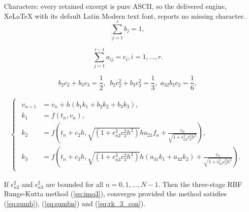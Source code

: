 \documentclass[10pt,a4paper]{amsart}
\begin{document}
Characters: every retained excerpt is pure ASCII, so the delivered engine, XeLaTeX with its default Latin Modern text font, reports no missing character.
\begin{equation}    \label{eq:sumb}
\sum_{j=1}^{r}{b_j} = 1,
\end{equation}

\begin{equation}    \label{eq:sumbn}
\sum_{j=1}^{i-1}{a_{ij}} = c_i, i = 1,...,r.
\end{equation}

\begin{equation}\label{eq:rk_3_con}
b_2 c_2 + b_3 c_3 = \frac{1}{2},\,\,\, b_2 c_2^2 + b_3 c_3^2 = \frac{1}{3},\,\, a_{32} b_3 c_2 = \frac{1}{6},
\end{equation}

\begin{eqnarray}    \label{eq:imq3}  
\begin{cases}
\begin{aligned}
v_{n+1} & = v_n + h(b_1 k_1 + b_2 k_2 + b_3 k_3),\\
k_1 &= f(t_n, v_n), \\
k_2 &= f\left(t_n + c_2 h, \sqrt{(1 + \epsilon_{n2}^2 c_{2}^2 h^2)}ha_{21} f_n + \frac{v_n} {\sqrt{1 + \epsilon_{n2}^2 c_{2}^2 h^2}}\right),\\
k_3 &= f\left(t_n + c_3 h, \sqrt{(1 + \epsilon_{n3}^2 c_{3}^2 h^2)}h (a_{31}k_1 + a_{32}k_2)+ \frac{v_n} {\sqrt{1 + \epsilon_{n3}^2 c_{3}^2 h^2}}\right). 
\end{aligned}    
\end{cases}    
\end{eqnarray}

\begin{theorem} If $\epsilon_{n2}^2$ and $\epsilon_{n3}^2$
are bounded for all $n = 0, 1, \dots, N - 1$. Then the
three-stage RBF Runge-Kutta method (\ref{eq:imq3}), converges provided the method satisfies (\ref{eq:sumb}), (\ref{eq:sumbn}) and
(\ref{eq:rk_3_con}).
\end{theorem}
\end{document}
